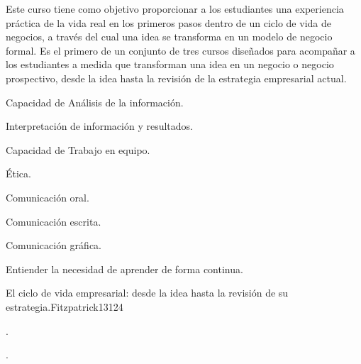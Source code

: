 \begin{syllabus}


\begin{justification}
Este curso tiene como objetivo proporcionar a los estudiantes una experiencia práctica de la vida  real en los  primeros pasos dentro de un ciclo de vida de negocios, a través del cual una idea se transforma en un modelo de negocio formal.
Es el primero de un conjunto de tres cursos diseñados para acompañar a los estudiantes a medida que transforman una idea en un negocio o negocio prospectivo, desde la idea  hasta la revisión de la estrategia empresarial actual.
\end{justification}

\begin{goals}
  \item Capacidad de Análisis de la información.
  \item Interpretación de información y resultados.
  \item Capacidad de Trabajo en equipo.
  \item Ética.
  \item Comunicación oral.
  \item Comunicación escrita.
  \item Comunicación gráfica.
  \item Entiender la necesidad de aprender de forma continua.
\end{goals}

\begin{outcomes}
\end{outcomes}

\begin{competences}
    \item {}
    \item {}
    \item {}
\end{competences}

\begin{unit}{El ciclo de vida empresarial: desde la idea hasta la revisión de su estrategia.}{}{Fitzpatrick13}{12}{4}
   \begin{topics}
      \item .
   \end{topics}
   \begin{learningoutcomes}
      \item .
   \end{learningoutcomes}
\end{unit}


\end{syllabus}
